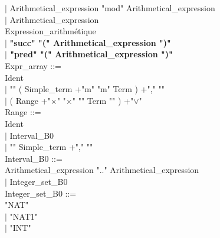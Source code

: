 \documentclass[12pt,a4paper,draft]{article}
\begin{document}
{\begin{sloppypar}
{\hspace*{0.20in} $|$  Arithmetical\_expression  "mod"  Arithmetical\_expression\\
\hspace*{0.20in} $|$  Arithmetical\_expression } \\
Expression\_arithmétique\\
\hspace*{0.20in} $|$\textbf{ "succ" "(" Arithmetical\_expression ")"\\
\hspace*{0.20in} $|$ "pred" "(" Arithmetical\_expression ")"} \\
Expr\_array ::= \\
\hspace*{0.20in}  Ident \\
\hspace*{0.20in} $|$ "{" ( Simple\_term +"m"  "m" Term ) +","  "}" \\
\hspace*{0.20in} $|$ ( Range +"$\times$" "$\times$"  "{" Term "}" ) +"$\lor$"\\
Range ::= \\
\hspace*{0.20in}  Ident \\
\hspace*{0.20in} $|$  Interval\_B0\\
\hspace*{0.20in} $|$ "{" Simple\_term +","  "}" \\
Interval\_B0 ::= \\
\hspace*{0.20in}  Arithmetical\_expression  ".."  Arithmetical\_expression \\
\hspace*{0.20in} $|$  Integer\_set\_B0\\
Integer\_set\_B0 ::= \\
\hspace*{0.20in}  "NAT"\\
\hspace*{0.20in} $|$ "NAT1"\\
\hspace*{0.20in} $|$ "INT" \\

\end{sloppypar} 
}
\end{document}
